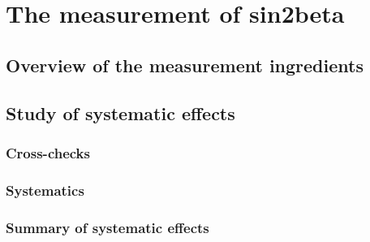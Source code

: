 
\chapter{The measurement of sin2beta}
\label{ch:measurement_of_sin2beta}

\section{Overview of the measurement ingredients}
\label{sec:measurement_of_sin2beta:overview}













\clearpage
\section{Study of systematic effects}
\label{sec:measurement_of_sin2beta:systematics}
\subsection{Cross-checks}
\label{sec:measurement_of_sin2beta:systematics:cross_checks}
\subsection{Systematics}
\label{sec:measurement_of_sin2beta:systematics:systematics}
\subsection{Summary of systematic effects}
\label{sec:measurement_of_sin2beta:systematics:summary}
